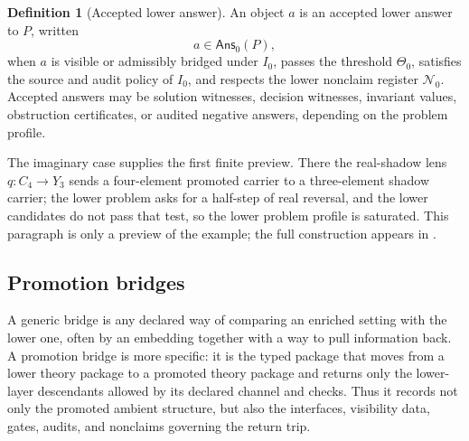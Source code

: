 \documentclass[11pt]{article}
\theoremstyle{definition}
\newtheorem{definition}[theorem]{Definition}
\begin{document}
\begin{definition}[Accepted lower answer]
\label{def:sau-accepted-answer}
An object \(a\) is an accepted lower answer to \(P\), written
\[
a\in\mathsf{Ans}_0(P),
\]
when \(a\) is visible or admissibly bridged under \(I_0\), passes the threshold \(\Theta_0\), satisfies the source and audit policy of \(I_0\), and respects the lower nonclaim register \(\mathcal N_0\). Accepted answers may be solution witnesses, decision witnesses, invariant values, obstruction certificates, or audited negative answers, depending on the problem profile.
\end{definition}

The imaginary case supplies the first finite preview.  There the real-shadow
lens \(q:C_4\to Y_3\) sends a four-element promoted carrier to a three-element
shadow carrier; the lower problem asks for a half-step of real reversal, and
the lower candidates do not pass that test, so the lower problem profile is
saturated.  This paragraph is only a preview of the example; the full
construction appears in .

\subsection{Promotion bridges}
\label{subsec:layers-promotion-bridges}

A generic bridge is any declared way of comparing an enriched setting with the
lower one, often by an embedding together with a way to pull information back.
A promotion bridge is more specific: it is the typed package that moves from a
lower theory package to a promoted theory package and returns only the
lower-layer descendants allowed by its declared channel and checks.  Thus it
records not only the promoted ambient structure, but also the interfaces,
visibility data, gates, audits, and nonclaims governing the return trip.
\end{document}
